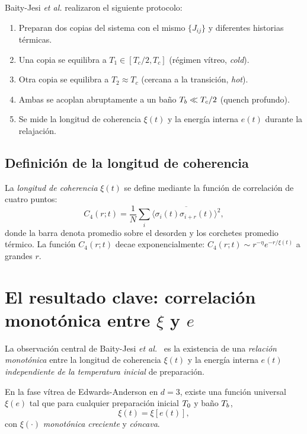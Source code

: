 Baity-Jesi \emph{et al.} realizaron el siguiente protocolo:
\begin{enumerate}
\item Preparan dos copias del sistema con el mismo $\{J_{ij}\}$ y diferentes 
historias térmicas.
\item Una copia se equilibra a $T_{1} \in [T_{c}/2, T_{c}]$ (régimen vítreo, 
\emph{cold}).
\item Otra copia se equilibra a $T_{2} \approx T_{c}$ (cercana a la transición, 
\emph{hot}).
\item Ambas se acoplan abruptamente a un baño $T_{b} \ll T_{c}/2$ (quench profundo).
\item Se mide la longitud de coherencia $\xi(t)$ y la energía interna $e(t)$ 
durante la relajación.
\end{enumerate}

\subsection{Definición de la longitud de coherencia}

La \emph{longitud de coherencia} $\xi(t)$ se define mediante la función de 
correlación de cuatro puntos:
\begin{equation}
    C_4(r; t) = \frac{1}{N} \sum_{i} \overline{ \langle \sigma_i(t) \sigma_{i+r}(t) \rangle^{2} },
    \label{eq:c4_correlation}
\end{equation}
%
donde la barra denota promedio sobre el desorden y los corchetes promedio 
térmico. La función $C_4(r; t)$ decae exponencialmente: 
$C_4(r; t) \sim r^{-\eta} e^{-r/\xi(t)}$ a grandes $r$.

\section{El resultado clave: correlación monotónica entre $\xi$ y $e$}

La observación central de Baity-Jesi \emph{et al.}~\cite{baityjesi2019} es la 
existencia de una \emph{relación monotónica} entre la longitud de coherencia 
$\xi(t)$ y la energía interna $e(t)$ \emph{independiente de la temperatura 
inicial} de preparación.

\begin{theorem}
\label{thm:xi_e_curve}
En la fase vítrea de Edwards-Anderson en $d = 3$, existe una función universal 
$\xi(e)$ tal que para cualquier preparación inicial $T_{0}$ y baño $T_{b}$,
\begin{equation}
    \xi(t) = \xi[e(t)],
\end{equation}
con $\xi(\cdot)$ \emph{monotónica creciente} y \emph{cóncava}.
\end{theorem}

